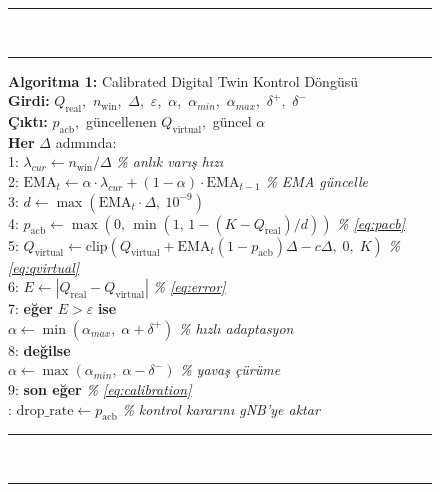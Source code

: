 \documentclass[conference]{IEEEtran}
\newcommand{\qreal}{Q_{\mathrm{real}}}
\newcommand{\qvirt}{Q_{\mathrm{virtual}}}
\newcommand{\pacb}{p_{\mathrm{acb}}}
\newcommand{\ema}{\mathrm{EMA}}
\begin{document}
\begin{figure}[t]
\vspace{-2pt}
\noindent\rule{\columnwidth}{0.5pt}\\[-5pt]
\noindent\rule{\columnwidth}{0.15pt}
\vspace{3pt}
{\small
\noindent\textbf{Algoritma 1:}
  Calibrated Digital Twin Kontrol Döngüsü\\[4pt]
\noindent\textbf{Girdi:}
  $\qreal$,\ $n_{\mathrm{win}}$,\ $\Delta$,\ $\varepsilon$,\ $\alpha$,\
  $\alpha_{min}$,\ $\alpha_{max}$,\ $\delta^{+}$,\ $\delta^{-}$\\
\noindent\textbf{Çıktı:}
  $\pacb$,\ güncellenen $\qvirt$,\ güncel $\alpha$\\[4pt]
\noindent\textbf{Her} $\Delta$ adımında:\\[2pt]
\noindent\phantom{0}1:\enspace
  $\lambda_{cur} \leftarrow n_{\mathrm{win}} / \Delta$
  \hfill\textit{\% anlık varış hızı}\\
\noindent\phantom{0}2:\enspace
  $\ema_t \leftarrow \alpha\cdot\lambda_{cur}+(1-\alpha)\cdot\ema_{t-1}$
  \hfill\textit{\% EMA güncelle}\\
\noindent\phantom{0}3:\enspace
  $d \leftarrow \max\!\left(\ema_t\cdot\Delta,\ 10^{-9}\right)$\\
\noindent\phantom{0}4:\enspace
  $\pacb \leftarrow \max\!\left(0,\,\min\!\left(1,\,1-(K-\qreal)/d\right)\right)$
  \hfill\textit{\% \eqref{eq:pacb}}\\
\noindent\phantom{0}5:\enspace
  $\qvirt \leftarrow
   \mathrm{clip}\!\left(\qvirt+\ema_t(1{-}\pacb)\Delta-c\Delta,\;0,\;K\right)$
  \hfill\textit{\% \eqref{eq:qvirtual}}\\
\noindent\phantom{0}6:\enspace
  $E \leftarrow \left|\qreal - \qvirt\right|$
  \hfill\textit{\% \eqref{eq:error}}\\
\noindent\phantom{0}7:\enspace
  \textbf{eğer} $E > \varepsilon$ \textbf{ise}\\
\noindent\phantom{07:}\enspace
  $\alpha \leftarrow \min(\alpha_{max},\;\alpha + \delta^{+})$
  \hfill\textit{\% hızlı adaptasyon}\\
\noindent\phantom{0}8:\enspace
  \textbf{değilse}\\
\noindent\phantom{08:}\enspace
  $\alpha \leftarrow \max(\alpha_{min},\;\alpha - \delta^{-})$
  \hfill\textit{\% yavaş çürüme}\\
\noindent\phantom{0}9:\enspace
  \textbf{son eğer}
  \hfill\textit{\% \eqref{eq:calibration}}\\
:\enspace
  $\text{drop\_rate} \leftarrow \pacb$
  \hfill\textit{\% kontrol kararını gNB'ye aktar}
}
\vspace{3pt}
\noindent\rule{\columnwidth}{0.15pt}\\[-5pt]
\noindent\rule{\columnwidth}{0.5pt}
\label{alg:cdt}
\end{figure}
\end{document}

